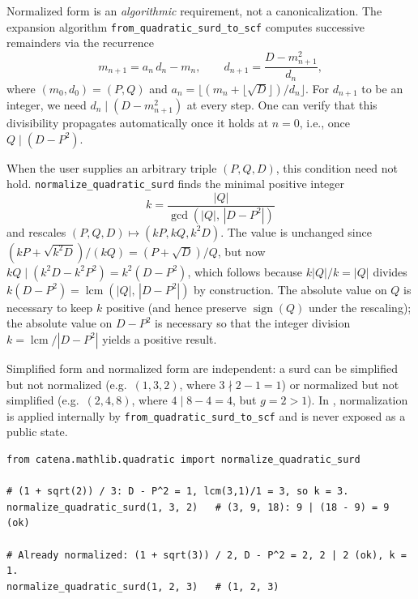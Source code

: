 \begin{remark}[Motivation]
  Normalized form is an \emph{algorithmic} requirement, not a canonicalization.  The expansion
  algorithm \texttt{from\_quadratic\_surd\_to\_scf} computes successive remainders via the recurrence
  \[
    m_{n+1} = a_n\, d_n - m_n,
    \qquad
    d_{n+1} = \frac{D - m_{n+1}^2}{d_n},
  \]
  where $(m_0, d_0) = (P, Q)$ and $a_n = \lfloor(m_n + \lfloor\sqrt{D}\rfloor)/d_n\rfloor$.
  For $d_{n+1}$ to be an integer, we need $d_n \mid (D - m_{n+1}^2)$ at every step.
  One can verify that this divisibility propagates automatically once it holds at $n = 0$,
  i.e., once $Q \mid (D - P^2)$.  

  When the user supplies an arbitrary triple $(P, Q, D)$, this condition need not hold.
  \texttt{normalize\_quadratic\_surd} finds the minimal positive integer
  \[
    k = \frac{|Q|}{\gcd(|Q|,\, |D - P^2|)}
  \]
  and rescales $(P, Q, D) \mapsto (kP, kQ, k^2 D)$.  The value is unchanged since
  $(kP + \sqrt{k^2 D})/(kQ) = (P + \sqrt{D})/Q$, but now $kQ \mid (k^2 D - k^2 P^2) = k^2(D -
  P^2)$, which follows because $k|Q| / k = |Q|$ divides $k(D - P^2) = \operatorname{lcm}(|Q|,\,|D -
  P^2|)$ by construction.  The absolute value on $Q$ is necessary to keep $k$ positive
  (and hence preserve $\operatorname{sign}(Q)$ under the rescaling); the absolute value on
  $D - P^2$ is necessary so that the integer division $k = \operatorname{lcm}/|D - P^2|$ yields
  a positive result.

  Simplified form and normalized form are independent: a surd can be simplified but not normalized
  (e.g.\ $(1, 3, 2)$, where $3 \nmid 2 - 1 = 1$) or normalized but not simplified (e.g.\
  $(2, 4, 8)$, where $4 \mid 8 - 4 = 4$, but $g = 2 > 1$).  In \catena, normalization is applied
  internally by \texttt{from\_quadratic\_surd\_to\_scf} and is never exposed as a public state.
\end{remark}

\begin{catenadef}
\begin{lstlisting}[style=python]
from catena.mathlib.quadratic import normalize_quadratic_surd

# (1 + sqrt(2)) / 3: D - P^2 = 1, lcm(3,1)/1 = 3, so k = 3.
normalize_quadratic_surd(1, 3, 2)   # (3, 9, 18): 9 | (18 - 9) = 9  (ok)

# Already normalized: (1 + sqrt(3)) / 2, D - P^2 = 2, 2 | 2 (ok), k = 1.
normalize_quadratic_surd(1, 2, 3)   # (1, 2, 3)
\end{lstlisting}
\end{catenadef}

